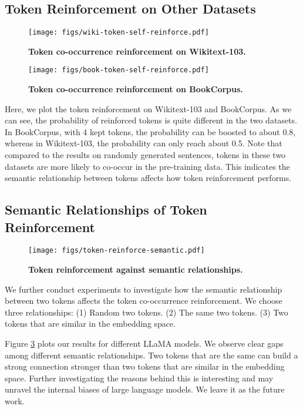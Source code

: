 \subsection{Token Reinforcement on Other Datasets}
\begin{figure}[t!]
    \centering
    \texttt{[image: figs/wiki-token-self-reinforce.pdf]}
  \caption{\textbf{Token co-occurrence reinforcement on Wikitext-103.} }
  \label{fig:wiki-token-reinforce}
\end{figure}
\begin{figure}[t!]
    \centering
    \texttt{[image: figs/book-token-self-reinforce.pdf]}
  \caption{\textbf{Token co-occurrence reinforcement on BookCorpus.} }
  \label{fig:book-token-reinforce}
\end{figure}

Here, we plot the token reinforcement on Wikitext-103 and BookCorpus. As we can see, the probability of reinforced tokens is quite different in the two datasets. In BookCorpus, with 4 kept tokens, the probability can be boosted to about 0.8, whereas in Wikitext-103, the probability can only reach about 0.5. 
Note that compared to the results on randomly generated sentences, tokens in these two datasets are more likely to co-occur in the pre-training data. 
This indicates the semantic relationship between tokens affects how token reinforcement performs. 

\subsection{Semantic Relationships of Token Reinforcement}

\begin{figure}[t!]
    \centering
    \texttt{[image: figs/token-reinforce-semantic.pdf]}
  \caption{\textbf{Token reinforcement against semantic relationships.} }
  \label{fig:semantic}
\end{figure}

We further conduct experiments to investigate how the semantic relationship between two tokens affects the token co-occurrence reinforcement. We choose three relationships: (1) Random two tokens. (2) The same two tokens. (3) Two tokens that are similar in the embedding space.

Figure \ref{fig:semantic} plots our results for different LLaMA models. We observe clear gaps among different semantic relationships. Two tokens that are the same can build a strong connection stronger than two tokens that are similar in the embedding space. Further investigating the reasons behind this is interesting and may unravel the internal biases of large language models. We leave it as the future work. 

